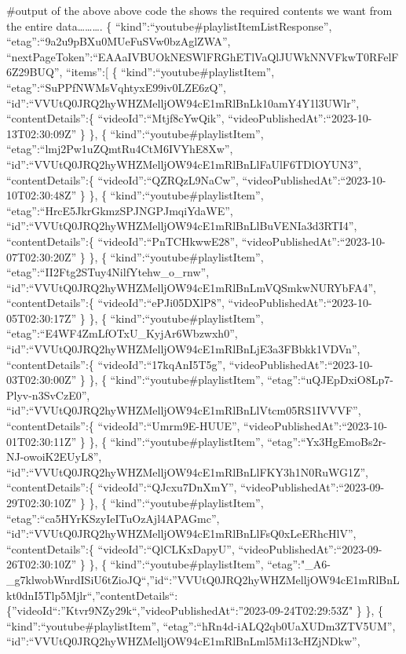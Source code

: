 \documentclass[11pt]{article}
\begin{document}
    \#output of the above above code the shows the required contents we want
from the entire data\ldots\ldots\ldots. \{
``kind'':``youtube\#playlistItemListResponse'',
``etag'':``9a2u9pBXu0MUeFuSVw0bzAglZWA'',
``nextPageToken'':``EAAaIVBUOkNESWlFRGhETlVaQlJUWkNNVFkwT0RFelF6Z29BUQ'',
``items'':{[} \{ ``kind'':``youtube\#playlistItem'',
``etag'':``SuPPfNWMsVqhtyxE99iv0LZE6zQ'',
``id'':``VVUtQ0JRQ2hyWHZMelljOW94cE1mRlBnLk10amY4Y1l3UWlr'',
``contentDetails'':\{ ``videoId'':``Mtjf8cYwQik'',
``videoPublishedAt'':``2023-10-13T02:30:09Z'' \} \}, \{
``kind'':``youtube\#playlistItem'',
``etag'':``lmj2Pw1uZQmtRu4CtM6IVYhE8Xw'',
``id'':``VVUtQ0JRQ2hyWHZMelljOW94cE1mRlBnLlFaUlF6TDlOYUN3'',
``contentDetails'':\{ ``videoId'':``QZRQzL9NaCw'',
``videoPublishedAt'':``2023-10-10T02:30:48Z'' \} \}, \{
``kind'':``youtube\#playlistItem'',
``etag'':``HrcE5JkrGkmzSPJNGPJmqiYdaWE'',
``id'':``VVUtQ0JRQ2hyWHZMelljOW94cE1mRlBnLlBuVENIa3d3RTI4'',
``contentDetails'':\{ ``videoId'':``PnTCHkwwE28'',
``videoPublishedAt'':``2023-10-07T02:30:20Z'' \} \}, \{
``kind'':``youtube\#playlistItem'',
``etag'':``II2Ftg2STuy4NilfYtehw\_o\_rnw'',
``id'':``VVUtQ0JRQ2hyWHZMelljOW94cE1mRlBnLmVQSmkwNURYbFA4'',
``contentDetails'':\{ ``videoId'':``ePJi05DXlP8'',
``videoPublishedAt'':``2023-10-05T02:30:17Z'' \} \}, \{
``kind'':``youtube\#playlistItem'',
``etag'':``E4WF4ZmLfOTxU\_KyjAr6Wbzwxh0'',
``id'':``VVUtQ0JRQ2hyWHZMelljOW94cE1mRlBnLjE3a3FBbkk1VDVn'',
``contentDetails'':\{ ``videoId'':``17kqAnI5T5g'',
``videoPublishedAt'':``2023-10-03T02:30:00Z'' \} \}, \{
``kind'':``youtube\#playlistItem'',
``etag'':``uQJEpDxiO8Lp7-Plyv-n3SvCzE0'',
``id'':``VVUtQ0JRQ2hyWHZMelljOW94cE1mRlBnLlVtcm05RS1IVVVF'',
``contentDetails'':\{ ``videoId'':``Umrm9E-HUUE'',
``videoPublishedAt'':``2023-10-01T02:30:11Z'' \} \}, \{
``kind'':``youtube\#playlistItem'',
``etag'':``Yx3HgEmoBs2r-NJ-owoiK2EUyL8'',
``id'':``VVUtQ0JRQ2hyWHZMelljOW94cE1mRlBnLlFKY3h1N0RuWG1Z'',
``contentDetails'':\{ ``videoId'':``QJcxu7DnXmY'',
``videoPublishedAt'':``2023-09-29T02:30:10Z'' \} \}, \{
``kind'':``youtube\#playlistItem'',
``etag'':``ca5HYrKSzyIeITuOzAjl4APAGmc'',
``id'':``VVUtQ0JRQ2hyWHZMelljOW94cE1mRlBnLlFsQ0xLeERhcHlV'',
``contentDetails'':\{ ``videoId'':``QlCLKxDapyU'',
``videoPublishedAt'':``2023-09-26T02:30:10Z'' \} \}, \{
``kind'':``youtube\#playlistItem'',
``etag'':"\_A6-\_g7klwobWnrdISiU6tZioJQ``,''id``:''VVUtQ0JRQ2hyWHZMelljOW94cE1mRlBnLkt0dnI5Tlp5Mjlr``,''contentDetails``:\{''videoId``:''Ktvr9NZy29k``,''videoPublishedAt``:''2023-09-24T02:29:53Z"
\} \}, \{ ``kind'':``youtube\#playlistItem'',
``etag'':``hRn4d-iALQ2qb0UaXUDm3ZTV5UM'',
``id'':``VVUtQ0JRQ2hyWHZMelljOW94cE1mRlBnLml5Mi13cHZjNDkw'',
\end{document}
